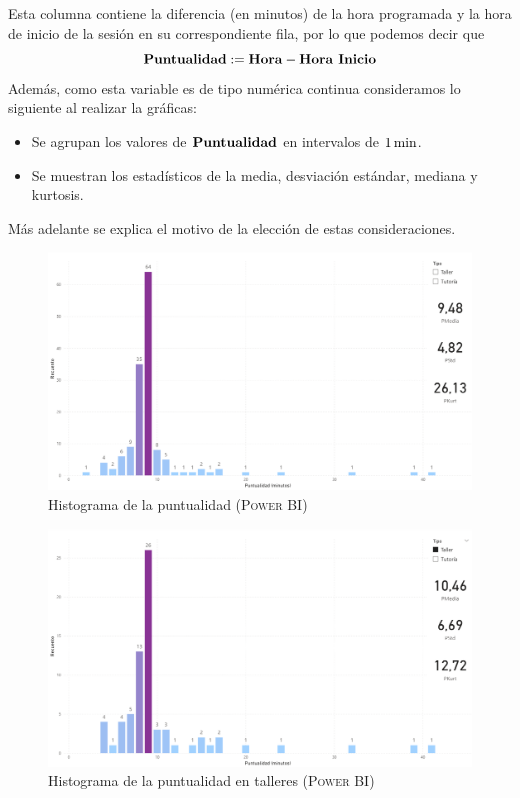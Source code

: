\documentclass[11pt,a4paper]{book}
\theoremstyle{definition}%
\begin{document}
                Esta columna contiene la diferencia (en minutos) de la hora programada y la hora de inicio de la sesión en su correspondiente fila, por lo que podemos decir que 
                \begin{equation*}
                    \textup{\textbf{Puntualidad}}:=\textup{\textbf{Hora}}-\textup{\textbf{Hora Inicio}}
                \end{equation*}
                Además, como esta variable es de tipo numérica continua consideramos lo siguiente al realizar la gráficas:
                \begin{itemize}
                    \item Se agrupan los valores de $\textup{\textbf{Puntualidad}}$ en intervalos de $1\,\textup{min}$.
                    \item Se muestran los estadísticos de la media, desviación estándar, mediana y kurtosis.
                \end{itemize}
                Más adelante se explica el motivo de la elección de estas consideraciones.
                \begin{figure}[H]
                    \centering
                    \includegraphics[width=1\textwidth]{Sources/histograma_PuntualidadGlobal.png}
                    \caption{Histograma de la puntualidad (\textsc{Power BI})}
                    \label{fig:histograma_PuntualidadGlobal}
                \end{figure}
                \begin{figure}[H]
                    \centering
                    \includegraphics[width=1\textwidth]{Sources/histograma_PuntualidadTaller.png}
                    \caption{Histograma de la puntualidad en talleres (\textsc{Power BI})}
                    \label{fig:histograma_PuntualidadTaller}
                \end{figure}
\end{document}
